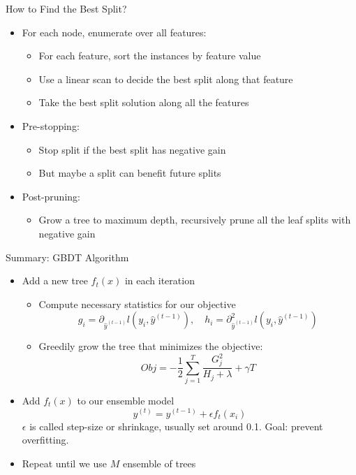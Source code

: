\begin{frame}{How to Find the Best Split?}

\begin{itemize}
    \item For each node, enumerate over all features:
    \begin{itemize}
        \item For each feature, sort the instances by feature value
        \item Use a linear scan to decide the best split along that feature
        \item Take the best split solution along all the features
    \end{itemize}
    
    \item Pre-stopping:
    \begin{itemize}
        \item Stop split if the best split has negative gain
        \item But maybe a split can benefit future splits
    \end{itemize}
    
    \item Post-pruning:
    \begin{itemize}
        \item Grow a tree to maximum depth, recursively prune all the leaf splits with negative gain
    \end{itemize}
\end{itemize}

\end{frame}

\begin{frame}{Summary: GBDT Algorithm}

\begin{itemize}
    \item Add a new tree $f_t(x)$ in each iteration
    \begin{itemize}
        \item Compute necessary statistics for our objective
        \[
            g_i = \partial_{\hat{y}^{(t-1)}} l(y_i, \hat{y}^{(t-1)}), \quad
            h_i = \partial^2_{\hat{y}^{(t-1)}} l(y_i, \hat{y}^{(t-1)})
        \]
        \item Greedily grow the tree that minimizes the objective:
        \[
            Obj = -\frac{1}{2} \sum_{j=1}^{T} \frac{G_j^2}{H_j + \lambda} + \gamma T
        \]
    \end{itemize}
    
    \item Add $f_t(x)$ to our ensemble model
    \[
        y^{(t)} = y^{(t-1)} + \epsilon f_t(x_i)
    \]
    $\epsilon$ is called step-size or shrinkage, usually set around 0.1.  
    Goal: prevent overfitting.

    \item Repeat until we use $M$ ensemble of trees
\end{itemize}

\end{frame}


